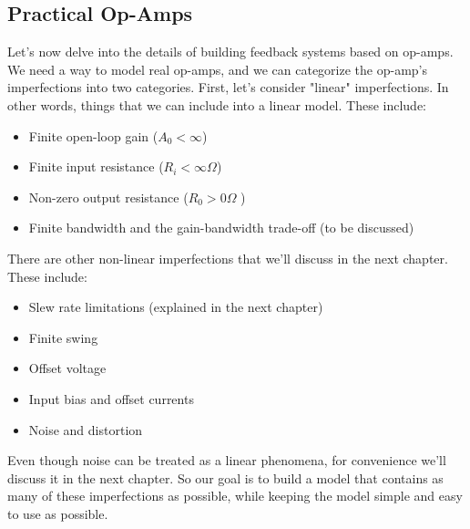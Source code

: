 \subsection{Practical Op-Amps}
Let's now delve into the details of building feedback systems based on op-amps.  We need a way to model real op-amps, and we can categorize the op-amp's imperfections into two categories.  First, let's consider "linear" imperfections. In other words, things that we can include into a linear model.  These include:
    \begin{itemize}
        \item  Finite open-loop gain ($A_0 < \infty$)
        \item  Finite input resistance ($R_i < \infty\Omega$)
     	\item Non-zero output resistance ($R_0 > 0\Omega$ )
     	\item Finite bandwidth and the gain-bandwidth trade-off (to be discussed) 
    \end{itemize}
There are other non-linear imperfections that we'll discuss in the next chapter.  These include:
    \begin{itemize}
        \item Slew rate limitations (explained in the next chapter)
        \item Finite swing
        \item Offset voltage
        \item Input bias and offset currents
        \item Noise and distortion
    \end{itemize}
Even though noise can be treated as a linear phenomena, for convenience we'll discuss it in the next chapter.  So our goal is to build a model that contains as many of these imperfections as possible, while keeping the model simple and easy to use as possible.
